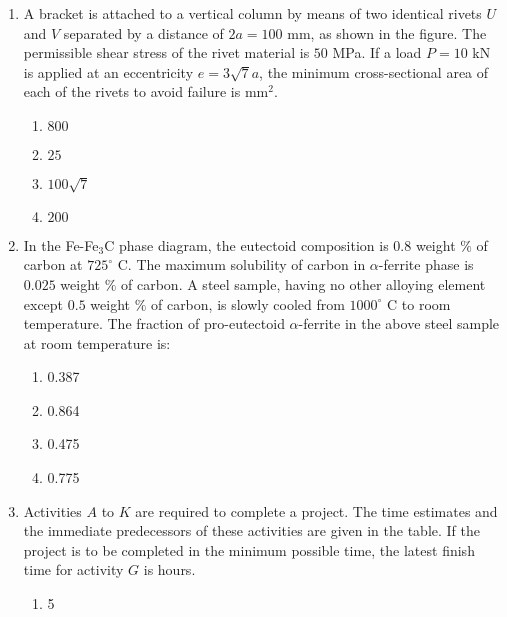 \documentclass[journal,12pt,onecolumn]{IEEEtran}
\theoremstyle{remark}
\begin{document}
\begin{enumerate}
    \item A bracket is attached to a vertical column by means of two identical rivets $U$ and $V$ separated by a distance of $2a = 100$ mm, as shown in the figure. The permissible shear stress of the rivet material is $50$ MPa. If a load $P = 10$ kN is applied at an eccentricity $e = 3\sqrt{7}a$, the minimum cross-sectional area of each of the rivets to avoid failure is {\underline{\hspace{2cm}}} mm$^2$.
     \begin{figure}[H]
        \centering
         
    \end{figure}   
    \begin{enumerate}
        \item $800$
        \item $25$
        \item $100\sqrt{7}$
        \item $200$
    \end{enumerate}
    \item In the Fe-Fe$_3$C phase diagram, the eutectoid composition is $0.8$ weight $\%$ of carbon at $725^\circ$ C. The maximum solubility of carbon in $\alpha$-ferrite phase is $0.025$ weight $\%$ of carbon. A steel sample, having no other alloying element except $0.5$ weight $\%$ of carbon, is slowly cooled from $1000^\circ$ C to room temperature. The fraction of pro-eutectoid $\alpha$-ferrite in the above steel sample at room temperature is:
    \begin{enumerate}
        \item 0.387
        \item 0.864
        \item 0.475
        \item 0.775
    \end{enumerate}
    \item Activities $A$ to $K$ are required to complete a project. The time estimates and the immediate predecessors of these activities are given in the table. If the project is to be completed in the minimum possible time, the latest finish time for activity $G$ is {\underline{\hspace{2cm}}} hours.
     \begin{figure}[H]
        \centering
          
    \end{figure}
    \begin{enumerate}
        \item 5

\end{enumerate}
\end{enumerate}
\end{document}
